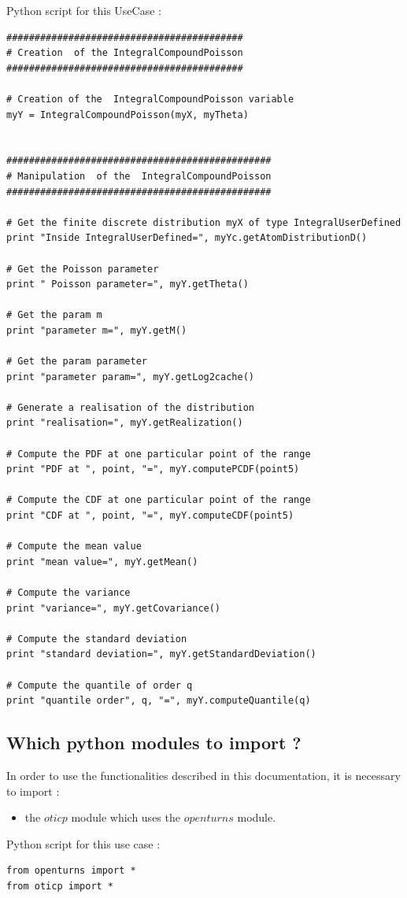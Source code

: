 \espace
Python  script for this UseCase :

\begin{lstlisting}
##########################################
# Creation  of the IntegralCompoundPoisson
##########################################

# Creation of the  IntegralCompoundPoisson variable
myY = IntegralCompoundPoisson(myX, myTheta)


###############################################
# Manipulation  of the  IntegralCompoundPoisson
###############################################

# Get the finite discrete distribution myX of type IntegralUserDefined
print "Inside IntegralUserDefined=", myYc.getAtomDistributionD()

# Get the Poisson parameter
print " Poisson parameter=", myY.getTheta()

# Get the param m
print "parameter m=", myY.getM()

# Get the param parameter
print "parameter param=", myY.getLog2cache()

# Generate a realisation of the distribution
print "realisation=", myY.getRealization()

# Compute the PDF at one particular point of the range
print "PDF at ", point, "=", myY.computePCDF(point5)

# Compute the CDF at one particular point of the range
print "CDF at ", point, "=", myY.computeCDF(point5)

# Compute the mean value
print "mean value=", myY.getMean()

# Compute the variance
print "variance=", myY.getCovariance()

# Compute the standard deviation
print "standard deviation=", myY.getStandardDeviation()

# Compute the quantile of order q
print "quantile order", q, "=", myY.computeQuantile(q)
\end{lstlisting}



\subsection{Which python modules to import ?}

In order to use the functionalities described in this documentation, it is necessary to import  : 
\begin{itemize}
   \item the $oticp$ module which uses the $openturns$ module.
\end{itemize}

Python script for this use case :

\begin{lstlisting}
from openturns import *
from oticp import *
\end{lstlisting}
